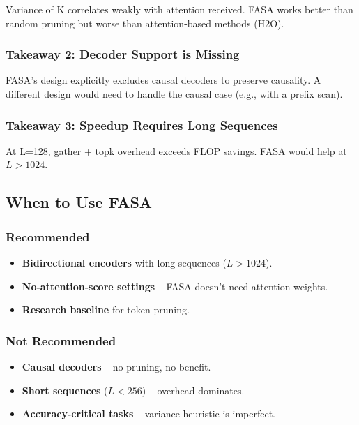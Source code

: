 Variance of K correlates weakly with attention received. FASA works better 
than random pruning but worse than attention-based methods (H2O).

\subsubsection{Takeaway 2: Decoder Support is Missing}

FASA's design explicitly excludes causal decoders to preserve causality. 
A different design would need to handle the causal case (e.g., with a 
prefix scan).

\subsubsection{Takeaway 3: Speedup Requires Long Sequences}

At L=128, gather + topk overhead exceeds FLOP savings. FASA would help at 
$L > 1024$.

\subsection{When to Use FASA}

\subsubsection{Recommended}

\begin{itemize}
\item \textbf{Bidirectional encoders} with long sequences ($L > 1024$).
\item \textbf{No-attention-score settings} -- FASA doesn't need attention weights.
\item \textbf{Research baseline} for token pruning.

\end{itemize}
\subsubsection{Not Recommended}

\begin{itemize}
\item \textbf{Causal decoders} -- no pruning, no benefit.
\item \textbf{Short sequences} ($L < 256$) -- overhead dominates.
\item \textbf{Accuracy-critical tasks} -- variance heuristic is imperfect.

\end{itemize}
